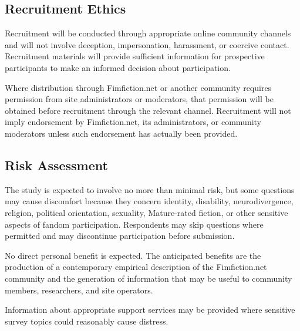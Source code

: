 
\subsection{Recruitment Ethics}

Recruitment will be conducted through appropriate online community channels and will not involve deception, impersonation, harassment, or coercive contact. Recruitment materials will provide sufficient information for prospective participants to make an informed decision about participation.

Where distribution through Fimfiction.net or another community requires permission from site administrators or moderators, that permission will be obtained before recruitment through the relevant channel. Recruitment will not imply endorsement by Fimfiction.net, its administrators, or community moderators unless such endorsement has actually been provided.


\subsection{Risk Assessment}

The study is expected to involve no more than minimal risk, but some questions may cause discomfort because they concern identity, disability, neurodivergence, religion, political orientation, sexuality, Mature-rated fiction, or other sensitive aspects of fandom participation. Respondents may skip questions where permitted and may discontinue participation before submission.

No direct personal benefit is expected. The anticipated benefits are the production of a contemporary empirical description of the Fimfiction.net community and the generation of information that may be useful to community members, researchers, and site operators.

Information about appropriate support services may be provided where sensitive survey topics could reasonably cause distress.


